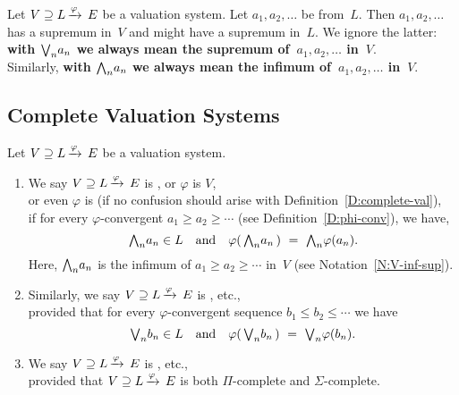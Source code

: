 \documentclass[main.tex]{subfiles}
\begin{document}
%
%
\begin{nt}
\label{N:V-inf-sup}
Let $V \supseteq L\,\smash{\xrightarrow{\varphi}\,E}$ be a  valuation system.
Let $a_1, a_2, \dotsc$ be from~$L$.
Then $a_1, a_2,\dotsc$ has a supremum
in~$V$ and might have a supremum in~$L$.
We ignore the latter:
\textbf{with $\textstyle{\bigvee}_n a_n$
we always mean the supremum of~$a_1, a_2,\dotsc $ in~$V$}.\\
Similarly, \textbf{with $\textstyle{\bigwedge}_n a_n$
we always mean the infimum of~$a_1, a_2,\dotsc $ in~$V$}.
\end{nt}
%
%
%
\subsection{Complete Valuation Systems}
\label{SS:complete-valuation-systems}
%
%
\begin{dfn}
\label{D:system-complete}
Let $V \supseteq L\,\smash{\xrightarrow{\varphi}\,E}$ be a valuation system.
\begin{enumerate}
\item 
We say $V \supseteq L\,\smash{\xrightarrow{\varphi}\,E}$
is ,
or  $\varphi$ is  $V$,\\
or even $\varphi$ is   (if no confusion should 
arise with
Definition~\ref{D:complete-val}),\\
if for every $\varphi$-convergent
$a_1\geq a_2 \geq \dotsb$ 
(see Definition~\ref{D:phi-conv}), we have,
\begin{equation*}
   \textstyle{\bigwedge}_n a_n \in L\quad 
  \text{and}\quad
  \varphi(\,\textstyle{\bigwedge}_n a_n\,) \ =\  \textstyle{\bigwedge}_n \varphi(a_n).
\end{equation*}
Here, $\textstyle{\bigwedge}_n a_n$
is the infimum of $a_1 \geq a_2 \geq \dotsb$ in~$V$
(see Notation~\ref{N:V-inf-sup}).

\item
Similarly,
we say $V \supseteq L\,\smash{\xrightarrow{\varphi}\,E}$
is , etc.,\\
provided that for every $\varphi$-convergent sequence
$b_1\leq b_2 \leq \dotsb$ we have
\begin{equation*}
   \textstyle{\bigvee}_n b_n \in L\quad 
  \text{and}\quad
  \varphi(\,\textstyle{\bigvee}_n b_n\,) \ =\  \textstyle{\bigvee}_n \varphi(b_n).
\end{equation*}

\item
We say $V \supseteq L\,\smash{\xrightarrow{\varphi}\,E}$
is , etc.,\\
provided that 
$V \supseteq L\,\smash{\xrightarrow{\varphi}\,E}$
is both $\Pi$-complete and $\Sigma$-complete.
\end{enumerate}
\end{dfn}
\end{document}
